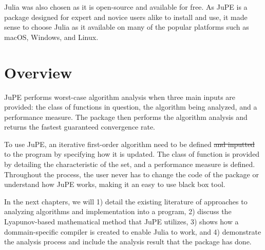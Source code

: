 Julia was also chosen as it is open-source and available for free. As JuPE is a package designed for expert and novice users alike to install and use, it made sense to choose Julia as it  available on many of the popular platforms such as macOS, Windows, and Linux.

\section{Overview}

JuPE performs worst-case algorithm analysis when three main inputs are provided: the class of functions in question, the algorithm being analyzed, and a performance measure. The package then performs the algorithm analysis and returns the fastest guaranteed convergence rate.

To use JuPE, an iterative first-order algorithm need to be defined \sout{and inputted}  to the program by specifying how it is updated. The class of function is provided by detailing the characteristic of the set, and a performance measure is defined. Throughout the process, the user never has to change the code of the package or understand how JuPE works, making it an easy to use black box tool.

In the next chapters, we will 1) detail the existing literature of approaches to analyzing algorithms and implementation into a program, 2) discuss the Lyapunov-based mathematical method that JuPE utilizes, 3) shows how a dommain-specific compiler is created to enable Julia to work, and 4) demonstrate the analysis process and include the analysis result that the package has done.


